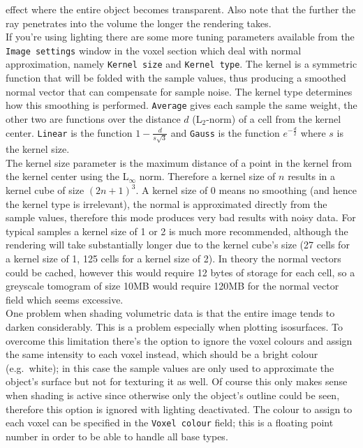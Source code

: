 \documentclass[11pt]{article}
\begin{document}
effect where the entire object becomes transparent. Also note that the further the
ray penetrates into the volume the longer the rendering takes.\\
If you're using lighting there are some more tuning parameters available from the
\texttt{Image settings} window in the voxel section which deal with normal approximation,
namely \texttt{Kernel size} and \texttt{Kernel type}. The kernel is a symmetric
function that will be folded with the sample values, thus producing a smoothed
normal vector that can compensate for sample noise. The kernel type determines how
this smoothing is performed. \texttt{Average} gives each sample the same weight, the other
two are functions over the distance $d$ (L$_2$-norm) of a cell from the kernel center.
\texttt{Linear} is the function $1 - \frac{d}{s \sqrt{3}}$ and \texttt{Gauss} is the function
$e^{-\frac{d}{2}}$ where $s$ is the kernel size.\\
The kernel size parameter is the maximum distance of a point in the kernel from the
kernel center using the L$_{\infty}$ norm. Therefore a kernel size of $n$ results in a
kernel cube of size $(2n + 1)^3$. A kernel size of 0 means no smoothing (and hence the
kernel type is irrelevant), the normal is approximated directly from the sample values,
therefore this mode produces very bad results with noisy data. For typical samples a
kernel size of 1 or 2 is much more recommended, although the rendering will take
substantially longer due to the kernel cube's size (27 cells for a kernel size of 1,
125 cells for a kernel size of 2). In theory the normal vectors could be cached, however
this would require 12 bytes of storage for each cell, so a greyscale tomogram of size
10MB would require 120MB for the normal vector field which seems excessive.\\
One problem when shading volumetric data is that the entire image tends to darken
considerably. This is a problem especially when plotting isosurfaces. To overcome
this limitation there's the option to ignore the voxel colours and assign the same
intensity to each voxel instead, which should be a bright colour (e.g.\ white); in this case
the sample values are only used to approximate the object's surface but not for texturing
it as well. Of course this only makes sense when shading is active since otherwise only
the object's outline could be seen, therefore this option is ignored with lighting
deactivated. The colour to assign to each voxel can be specified in the \texttt{Voxel colour}
field; this is a floating point number in order to be able to handle all base types.
\end{document}
